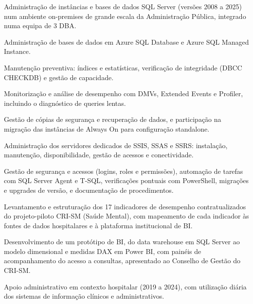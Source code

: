 
\begin{itens}
  \item Administração de instâncias e bases de dados SQL Server (versões 2008 a 2025) num ambiente on-premises de grande escala da Administração Pública, integrado numa equipa de 3 DBA.
  \item Administração de bases de dados em Azure SQL Database e Azure SQL Managed Instance.
  \item Manutenção preventiva: índices e estatísticas, verificação de integridade (DBCC CHECKDB) e gestão de capacidade.
  \item Monitorização e análise de desempenho com DMVs, Extended Events e Profiler, incluindo o diagnóstico de queries lentas.
  \item Gestão de cópias de segurança e recuperação de dados, e participação na migração das instâncias de Always On para configuração standalone.
  \item Administração dos servidores dedicados de SSIS, SSAS e SSRS: instalação, manutenção, disponibilidade, gestão de acessos e conectividade.
  \item Gestão de segurança e acessos (logins, roles e permissões), automação de tarefas com SQL Server Agent e T-SQL, verificações pontuais com PowerShell, migrações e upgrades de versão, e documentação de procedimentos.
\end{itens}

\begin{itens}
  \item Levantamento e estruturação dos 17 indicadores de desempenho contratualizados do projeto-piloto CRI-SM (Saúde Mental), com mapeamento de cada indicador às fontes de dados hospitalares e à plataforma institucional de BI.
  \item Desenvolvimento de um protótipo de BI, do data warehouse em SQL Server ao modelo dimensional e medidas DAX em Power BI, com painéis de acompanhamento do acesso a consultas, apresentado ao Conselho de Gestão do CRI-SM.
  \item Apoio administrativo em contexto hospitalar (2019 a 2024), com utilização diária dos sistemas de informação clínicos e administrativos.
\end{itens}

